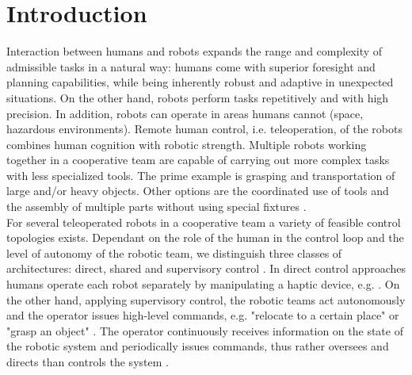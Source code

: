 \documentclass[a4paper,twoside, openright,12pt]{report}
\begin{document}
\chapter{Introduction}

%
Interaction between humans and robots expands the range and complexity of admissible tasks in a natural way: humans come with superior foresight and planning capabilities, while being inherently robust and adaptive in unexpected situations. On the other hand, robots perform tasks repetitively and with high precision. In addition, robots can operate in areas humans cannot (space, hazardous environments). Remote human control, i.e. teleoperation, of the robots combines human cognition with robotic strength. Multiple robots working together in a cooperative team are capable of carrying out more complex tasks with less specialized tools. The prime example is grasping and transportation of large and/or heavy objects. Other options are the coordinated use of tools and the assembly of multiple parts without using special fixtures \cite{CoopManipHandbook}.\\
For several teleoperated robots in a cooperative team a variety of feasible control topologies exists. Dependant on the role of the human in the control loop and the level of autonomy of the robotic team, we distinguish three classes of architectures: direct, shared and supervisory control \cite{Hirche_12}. In direct control approaches humans operate each robot separately by manipulating a haptic device, e.g. \cite{Goertz_52}. On the other hand, applying supervisory control, the robotic teams act autonomously and the operator issues high-level commands, e.g. "relocate to a certain place" or "grasp an object" \cite{Peters_15}. The operator continuously receives information on the state of the robotic system and periodically issues commands, thus rather oversees and directs than controls the system \cite{Sheridian_92}.
\end{document}
